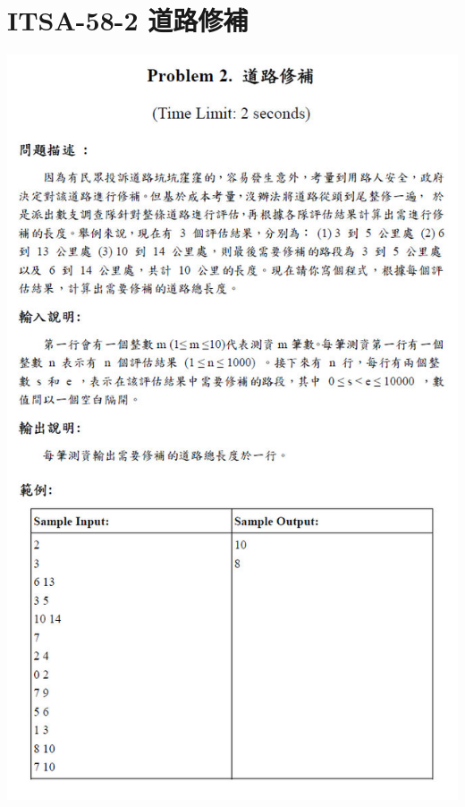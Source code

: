\section{ITSA-58-2 道路修補}
\centerline{\includegraphics[height=.95\textheight]{../solutions/fig/58ITSA2}}

